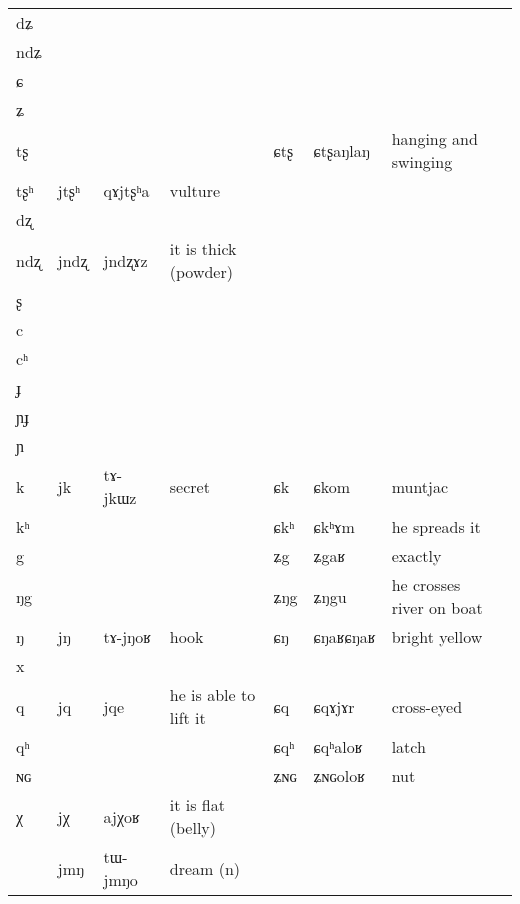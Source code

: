 \documentclass[oldfontcommands,oneside,a4paper,11pt]{article}
\newcommand{\ipa}[1]{{\phon #1}} %
\newcommand{\idph}[1]{\cellcolor{gray}\textbf{#1}}
\begin{document}
\begin{table}
{\begin{tabular}{l|lll|lll|l}
\ipa{dʑ}  & 	  & 	  & 	  & 	  & 	  & 	  & 	\\
\ipa{ndʑ}  & 	  & 	  & 	  & 	  & 	  & 	  & 	\\
\ipa{ɕ}  & 	  & 	  & 	  & 	  & 	  & 	  & 	\\
\ipa{ʑ}  & 	  & 	  & 	  & 	  & 	  & 	  & 	\\
\ipa{tʂ}  & 	  & 	  & 	  & 	 \ipa{ɕtʂ} \idph{}  & 	 \ipa{ɕtʂaŋlaŋ}  & 	 hanging and swinging & 	\\
\ipa{tʂʰ}  & 	 \ipa{jtʂʰ}  & 	 \ipa{qɤjtʂʰa}  & 	vulture  & 	  & 	  & 	  & 	\\
\ipa{dʐ}  & 	  & 	  & 	  & 	  & 	  & 	  & 	\\
\ipa{ndʐ}  & 	 \ipa{jndʐ}  & 	 \ipa{jndʐɤz}  & 	it is thick (powder)  & 	  & 	  & 	  & 	\\
\ipa{ʂ}  & 	  & 	  & 	  & 	  & 	  & 	  & 	\\
\ipa{c}  & 	  & 	  & 	  & 	  & 	  & 	  & 	\\
\ipa{cʰ}  & 	  & 	  & 	  & 	  & 	  & 	  & 	\\
\ipa{ɟ}  & 	  & 	  & 	  & 	  & 	  & 	  & 	\\
\ipa{ɲɟ}  & 	  & 	  & 	  & 	  & 	  & 	  & 	\\
\ipa{ɲ}  & 	  & 	  & 	  & 	  & 	  & 	  & 	\\
\ipa{k}  &	 \ipa{jk}  &	 \ipa{tɤ-jkɯz}  &	 secret  &	 \ipa{ɕk}  &	 \ipa{ɕkom}  &	 muntjac  &	\\	
\ipa{kʰ}  &	  &	  &	  &	 \ipa{ɕkʰ}  &	 \ipa{ɕkʰɤm}  &	 he spreads it  &	\\	
\ipa{g}  &	  &	  &	  &	 \ipa{ʑg}  &	 \ipa{ʑgaʁ}  &	 exactly  &	\\	
\ipa{ŋg}  &	  &	  &	  &	 \ipa{ʑŋg}  &	 \ipa{ʑŋgu}  &	 he crosses river on boat  &	\\	
\ipa{ŋ}  &	 \ipa{jŋ}  &	 \ipa{tɤ-jŋoʁ}  &	 hook  &	 \ipa{ɕŋ} \idph{}  &	 \ipa{ɕŋaʁɕŋaʁ}  &	 bright yellow  &	\\	
\ipa{x}  &	  &	  &	  &	  &	  &	  &	\\	
\ipa{q}  &	 \ipa{jq}  &	 \ipa{jqe}  &	 he is able to lift it  &	 \ipa{ɕq}  &	 \ipa{ɕqɤjɤr}  &	 cross-eyed  &	\\	
\ipa{qʰ}  &	  &	  &	  &	 \ipa{ɕqʰ}  &	 \ipa{ɕqʰaloʁ}  &	 latch  &	\\	
\ipa{ɴɢ}  &	  &	  &	  &	 \ipa{ʑɴɢ}  &	 \ipa{ʑɴɢoloʁ}  &	 nut  &	\\	
\ipa{χ}  &	 \ipa{jχ}  &	 \ipa{ajχoʁ}  &	 it is flat (belly)  &	  &	  &	  &	\\	
\midrule  					 
 &\ipa{jmŋ} & \ipa{tɯ-jmŋo} &dream (n) \\  
  \end{tabular}}
\end{table}
  
\end{document}
